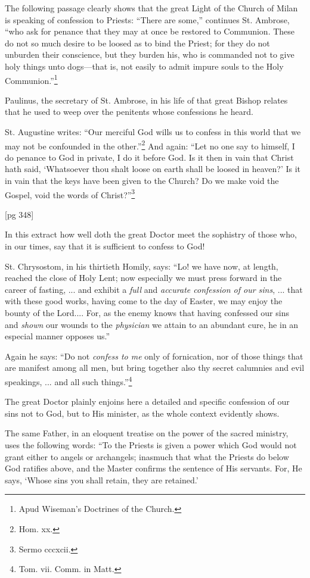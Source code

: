 The following passage clearly shows that the
great Light of the Church of Milan is speaking of
confession to Priests: “There are some,” continues
St. Ambrose, “who ask for penance that
they may at once be restored to Communion.
These do not so much desire to be loosed as to
bind the Priest; for they do not unburden their
conscience, but they burden his, who is commanded
not to give holy things unto dogs—that is, not
easily to admit impure souls to the Holy Communion.”\footnote{Apud
Wiseman's Doctrines of the Church.}

Paulinus, the secretary of St. Ambrose, in his
life of that great Bishop relates that he used to
weep over the penitents whose confessions he
heard.

St. Augustine writes: “Our merciful God wills
us to confess in this world that we may not be confounded
in the other.”\footnote{Hom.
xx.} And again: “Let no one
say to himself, I do penance to God in private, I do
it before God. Is it then in vain that Christ hath
said, ‘Whatsoever thou shalt loose on earth shall
be loosed in heaven?’ Is it in vain that the keys
have been given to the Church? Do we make void
the Gospel, void the words of Christ?”\footnote{Sermo cccxcii.}

[pg 348]

In this extract how well doth the great Doctor
meet the sophistry of those who, in our times, say
that it is sufficient to confess to God!

St. Chrysostom, in his thirtieth Homily, says:
“Lo! we have now, at length, reached the close of
Holy Lent; now especially we must press forward
in the career of fasting, ... and exhibit a \emph{full} and
\emph{accurate confession of our sins}, ... that with
these good works, having come to the day of Easter,
we may enjoy the bounty of the Lord....
For, as the enemy knows that having confessed our
sins and \emph{shown} our wounds to the \emph{physician} we
attain to an abundant cure, he in an especial manner
opposes us.”

Again he says: “Do not \emph{confess to me} only
of fornication, nor of those things that are manifest
among all men, but bring together also thy
secret calumnies and evil speakings, ... and all
such things.”\footnote{Tom. vii. Comm. in Matt.}

The great Doctor plainly enjoins here a detailed
and specific confession of our sins not to God, but
to His minister, as the whole context evidently
shows.

The same Father, in an eloquent treatise on the
power of the sacred ministry, uses the following
words: “To the Priests is given a power which
God would not grant either to angels or archangels;
inasmuch that what the Priests do below
God ratifies above, and the Master confirms the
sentence of His servants. For, He says, ‘Whose
sins you shall retain, they are retained.’

